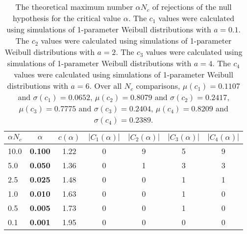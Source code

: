 \begin{table}[h!]
\begin{center}
\begin{tabular}{l | c | c || c | c | c | c}
$\alpha N_c$ & $\alpha$ & $c(\alpha)$ & $|C_1(\alpha)|$ & $|C_2(\alpha)|$ & $|C_3(\alpha)|$ & $|C_4(\alpha)|$ \\\hline
10.0 & {\bf 0.100} & 1.22 & 0 & 9 & 5 & 9 \\
5.0 & {\bf 0.050} & 1.36 & 0 & 1 & 3 & 3 \\\hline
2.5 & {\bf 0.025} & 1.48 & 0 & 0 & 1 & 1 \\
1.0 & {\bf 0.010} & 1.63 & 0 & 0 & 1 & 0 \\\hline
0.5 & {\bf 0.005} & 1.73 & 0 & 0 & 1 & 0 \\
0.1 & {\bf 0.001} & 1.95 & 0 & 0 & 0 & 0 \\
\end{tabular}
\caption{The theoretical maximum number $\alpha N_c$ of rejections
        of the null hypothesis for the critical value $\alpha$.
        The $c_1$ values were calculated using simulations of 1-parameter Weibull distributions with $a=0.1$.
        The $c_2$ values were calculated using simulations of 1-parameter Weibull distributions with $a=2$.
        The $c_3$ values were calculated using simulations of 1-parameter Weibull distributions with $a=4$.
        The $c_4$ values were calculated using simulations of 1-parameter Weibull distributions with $a=6$.
        Over all $N_c$ comparisons,
         $\mu(c_1)=0.1107$ and $\sigma(c_1)=0.0652$,
         $\mu(c_2)=0.8079$ and $\sigma(c_2)=0.2417$,
         $\mu(c_3)=0.7775$ and $\sigma(c_3)=0.2404$,
         $\mu(c_4)=0.8209$ and $\sigma(c_4)=0.2389$.
	}\label{tab:true}
\end{center}
\end{table}
